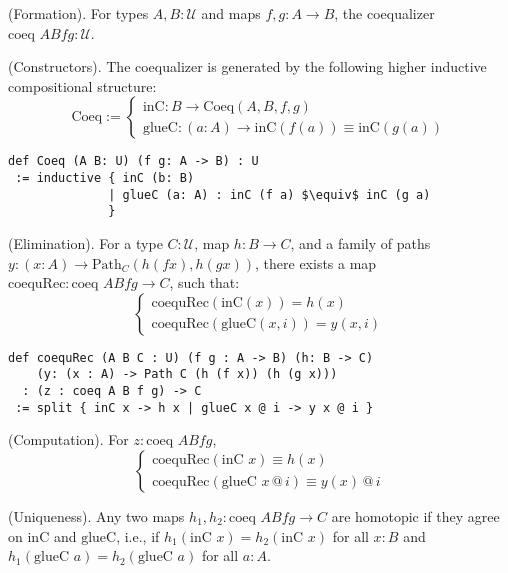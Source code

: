 \documentclass{article}
\begin{document}
\begin{definition} (Formation).
For types \( A, B : \mathcal{U} \) and maps \( f, g : A \to B \),
the coequalizer \( \text{coeq } A B f g : \mathcal{U} \).
\end{definition}

\begin{definition} (Constructors).
The coequalizer is generated by the following higher inductive compositional structure:
\[
\text{Coeq} :=
\begin{cases}
\text{inC} : B \to \text{Coeq}(A,B,f,g) \\
\text{glueC} : (a : A) \to \text{inC}(f(a)) \equiv \text{inC}(g(a))
\end{cases}
\]
\begin{lstlisting}[mathescape=true]
def Coeq (A B: U) (f g: A -> B) : U
 := inductive { inC (b: B)
              | glueC (a: A) : inC (f a) $\equiv$ inC (g a)
              }
\end{lstlisting}
\end{definition}

\begin{theorem} (Elimination).
For a type \( C : \mathcal{U} \), map \( h : B \to C \), and a family of paths \( y : (x : A) \to \text{Path}_C (h (f x), h (g x)) \), there exists a map \( \text{coequRec} : \text{coeq } A B f g \to C \), such that:
\[
\begin{cases}
\text{coequRec}(\text{inC}(x)) = h(x) \\
\text{coequRec}(\text{glueC}(x,i)) = y(x,i)
\end{cases}
\]
\begin{lstlisting}
def coequRec (A B C : U) (f g : A -> B) (h: B -> C)
    (y: (x : A) -> Path C (h (f x)) (h (g x)))
  : (z : coeq A B f g) -> C
 := split { inC x -> h x | glueC x @ i -> y x @ i }
\end{lstlisting}
\end{theorem}

\begin{theorem} (Computation).
For \( z : \text{coeq } A B f g \),
\[
\begin{cases}
\text{coequRec}(\text{inC } x) \equiv h(x) \\
\text{coequRec}(\text{glueC } x \, @ \, i) \equiv y(x) \, @ \, i
\end{cases}
\]
\end{theorem}

\begin{theorem} (Uniqueness).
Any two maps \( h_1, h_2 : \text{coeq } A B f g \to C \) are homotopic
if they agree on \( \text{inC} \) and \( \text{glueC} \), i.e.,
if \( h_1(\text{inC } x) = h_2(\text{inC } x) \) for
all \( x : B \) and \( h_1(\text{glueC } a) = h_2(\text{glueC } a) \) for all \( a : A \).
\end{theorem}
\end{document}
